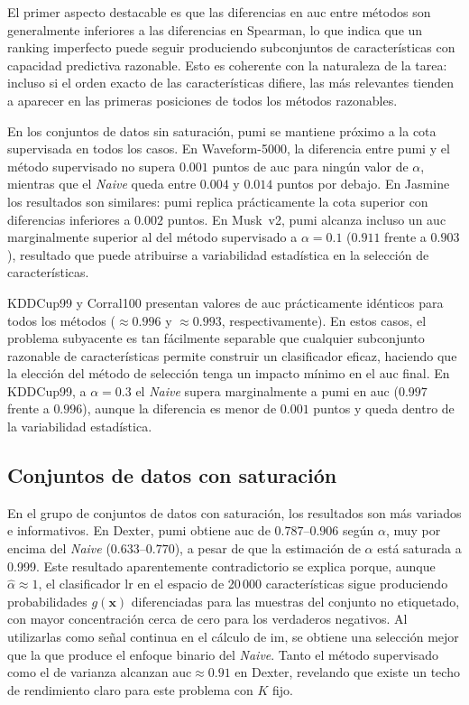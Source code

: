 El primer aspecto destacable es que las diferencias en \acrshort{auc} entre métodos son generalmente inferiores a las diferencias en Spearman, lo que indica que un ranking imperfecto puede seguir produciendo subconjuntos de características con capacidad predictiva razonable. Esto es coherente con la naturaleza de la tarea: incluso si el orden exacto de las características difiere, las más relevantes tienden a aparecer en las primeras posiciones de todos los métodos razonables.

En los conjuntos de datos sin saturación, \acrshort{pumi} se mantiene próximo a la cota supervisada en todos los casos. En Waveform-5000, la diferencia entre \acrshort{pumi} y el método supervisado no supera $0.001$ puntos de \acrshort{auc} para ningún valor de $\alpha$, mientras que el \textit{Naive} queda entre $0.004$ y $0.014$ puntos por debajo. En Jasmine los resultados son similares: \acrshort{pumi} replica prácticamente la cota superior con diferencias inferiores a $0.002$ puntos. En Musk~v2, \acrshort{pumi} alcanza incluso un \acrshort{auc} marginalmente superior al del método supervisado a $\alpha=0.1$ ($0.911$ frente a $0.903$), resultado que puede atribuirse a variabilidad estadística en la selección de características.

KDDCup99 y Corral100 presentan valores de \acrshort{auc} prácticamente idénticos para todos los métodos ($\approx 0.996$ y $\approx 0.993$, respectivamente). En estos casos, el problema subyacente es tan fácilmente separable que cualquier subconjunto razonable de características permite construir un clasificador eficaz, haciendo que la elección del método de selección tenga un impacto mínimo en el \acrshort{auc} final. En KDDCup99, a $\alpha=0.3$ el \textit{Naive} supera marginalmente a \acrshort{pumi} en \acrshort{auc} ($0.997$ frente a $0.996$), aunque la diferencia es menor de $0.001$ puntos y queda dentro de la variabilidad estadística.

\subsection{Conjuntos de datos con saturación}
\label{subsec:auc_saturacion}

En el grupo de conjuntos de datos con saturación, los resultados son más variados e informativos. En Dexter, \acrshort{pumi} obtiene \acrshort{auc} de $0.787$--$0.906$ según $\alpha$, muy por encima del \textit{Naive} ($0.633$--$0.770$), a pesar de que la estimación de $\alpha$ está saturada a 0.999. Este resultado aparentemente contradictorio se explica porque, aunque $\hat{\alpha} \approx 1$, el clasificador \acrshort{lr} en el espacio de 20\,000 características sigue produciendo probabilidades $g(\mathbf{x})$ diferenciadas para las muestras del conjunto no etiquetado, con mayor concentración cerca de cero para los verdaderos negativos. Al utilizarlas como señal continua en el cálculo de \acrshort{im}, se obtiene una selección mejor que la que produce el enfoque binario del \textit{Naive}. Tanto el método supervisado como el de varianza alcanzan \acrshort{auc}$\approx 0.91$ en Dexter, revelando que existe un techo de rendimiento claro para este problema con $K$ fijo.

